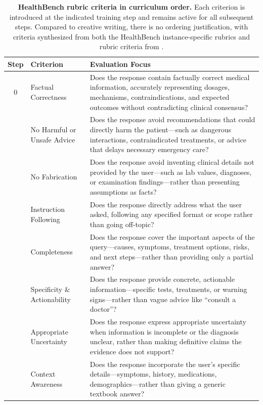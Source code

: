 \documentclass{article}
\theoremstyle{plain}
\theoremstyle{definition}
\theoremstyle{remark}
\begin{document}
\begin{table}[h]
\centering
\footnotesize
\caption{\textbf{HealthBench rubric criteria in curriculum order.} Each criterion is introduced at the indicated training step and remains active for all subsequent steps. Compared to creative writing, there is no ordering justification, with criteria synthesized from both the HealthBench instance-specific rubrics and rubric criteria from \citet{yang2026healthscorescalablerubricsimproving}.}
\begin{tabular}{clp{11cm}}
\toprule
\textbf{Step} & \textbf{Criterion} & \textbf{Evaluation Focus} \\
\midrule
0 & Factual Correctness & Does the response contain factually correct medical information, accurately representing dosages, mechanisms, contraindications, and expected outcomes without contradicting clinical consensus? \\
\addlinespace
50 & No Harmful or Unsafe Advice & Does the response avoid recommendations that could directly harm the patient---such as dangerous interactions, contraindicated treatments, or advice that delays necessary emergency care? \\
\addlinespace
100 & No Fabrication & Does the response avoid inventing clinical details not provided by the user---such as lab values, diagnoses, or examination findings---rather than presenting assumptions as facts? \\
\addlinespace
150 & Instruction Following & Does the response directly address what the user asked, following any specified format or scope rather than going off-topic? \\
\addlinespace
200 & Completeness & Does the response cover the important aspects of the query---causes, symptoms, treatment options, risks, and next steps---rather than providing only a partial answer? \\
\addlinespace
250 & Specificity \& Actionability & Does the response provide concrete, actionable information---specific tests, treatments, or warning signs---rather than vague advice like ``consult a doctor''? \\
\addlinespace
300 & Appropriate Uncertainty & Does the response express appropriate uncertainty when information is incomplete or the diagnosis unclear, rather than making definitive claims the evidence does not support? \\
\addlinespace
350 & Context Awareness & Does the response incorporate the user's specific details---symptoms, history, medications, demographics---rather than giving a generic textbook answer? \\

\end{tabular}
\end{table}
\end{document}
